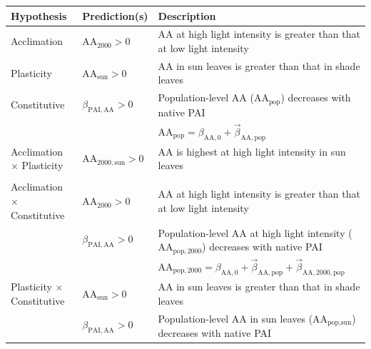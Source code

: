 \documentclass[
  letterpaper,
  DIV=11,
  numbers=noendperiod]{scrartcl}
\newcommand{\aax}{$\mathrm{AA}$}
\begin{document}
\begin{longtable}{>{\raggedright\arraybackslash}p{1in}>{\raggedright\arraybackslash}p{1.5in}>{\raggedright\arraybackslash}p{3in}}
\toprule
\textbf{Hypothesis} & \textbf{Prediction(s)} & \textbf{Description}\\
\midrule
Acclimation & $\mathrm{AA}_{2000} > 0$ & \hspace{-1em}\aax{} at high light intensity is greater than that at low light intensity\\
\cmidrule{1-3}\pagebreak[0]
Plasticity & $\mathrm{AA}_{\text{sun}} > 0$ & \hspace{-1em}\aax{} in sun leaves is greater than that in shade leaves\\
\cmidrule{1-3}\pagebreak[0]
Constitutive & $\beta_{\mathrm{PAI,AA}} > 0$ & \hspace{-1em}Population-level \aax{} ($\mathrm{AA}_\text{pop}$) decreases with native PAI\\
\nopagebreak
 &  & \hspace{-1em}$\mathrm{AA}_\text{pop} = \beta_{\mathrm{AA}, 0} + \vec{\beta}_{\mathrm{AA}, \text{pop}}$\\
\cmidrule{1-3}\pagebreak[0]
Acclimation $\times$ Plasticity & $\mathrm{AA}_{2000,\text{sun}} > 0$ & \hspace{-1em}\aax{} is highest at high light intensity in sun leaves\\
\nopagebreak
 &  & \hspace{-1em}\\
\cmidrule{1-3}\pagebreak[0]
Acclimation $\times$ Constitutive & $\mathrm{AA}_{2000} > 0$ & \hspace{-1em}\aax{} at high light intensity is greater than that at low light intensity\\
\nopagebreak
 & $\beta_{\mathrm{PAI,AA}} > 0$ & \hspace{-1em}Population-level \aax{} at high light intensity ($\mathrm{AA}_{\text{pop},2000}$) decreases with native PAI\\
\nopagebreak
 &  & \hspace{-1em}$\mathrm{AA}_{\text{pop},2000} = \beta_{\mathrm{AA}, 0} + \vec{\beta}_{\mathrm{AA}, \text{pop}} + \vec{\beta}_{\mathrm{AA}, 2000, \text{pop}}$\\
\cmidrule{1-3}\pagebreak[0]
Plasticity $\times$ Constitutive & $\mathrm{AA}_{\text{sun}} > 0$ & \hspace{-1em}\aax{} in sun leaves is greater than that in shade leaves\\
\nopagebreak
 & $\beta_{\mathrm{PAI,AA}} > 0$ & \hspace{-1em}Population-level \aax{} in sun leaves ($\mathrm{AA}_{\text{pop},\text{sun}}$) decreases with native PAI\\

\end{longtable}
\end{document}

